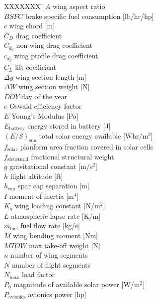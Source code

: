 \documentclass[]{aiaa-tc}%
\begin{document}
\begin{multicols}{2}
\small

\begin{tabbing}
  XXXXXXX \= \kill%
$A$ \> wing aspect ratio \\
$BSFC$ \> brake specific fuel consumption [lb/hr/hp] \\
$c$ \> wing chord [m] \\
$C_D$ \> drag coefficient \\
$C_{d_0}$ \> non-wing drag coefficient \\
$c_{d_p}$ \> wing profile drag coefficient \\
$C_L$ \> lift coefficient \\
$\Delta y$ \> wing section length [m] \\
$\Delta W$ \> wing section weight [N] \\
$DOY$ \> day of the year \\
$e$ \> Oswald efficiency factor \\
$E$ \> Young's Modulus [Pa] \\
$E_{\text{battery}}$ \> energy stored in battery [J] \\
$(E/S)_{\text{sun}}$ \> total solar energy available [Whr/m$^2$] \\
$f_{\text{solar}}$ \> planform area fraction covered in solar cells \\
$f_{\text{structural}}$ \> fractional structural weight\\
$g$ \> gravitational constant [m/s$^2$] \\
$h$ \> flight altitude [ft] \\
$h_{\text{cap}}$ \> spar cap separation [m] \\
$I$ \> moment of inertia [m$^4$] \\
$K_q$ \> wing loading constant [N/m$^2$] \\
$L$ \> atmospheric lapse rate [K/m] \\
$\dot{m}_{\text{fuel}}$ \> fuel flow rate [kg/s] \\
$M$ \> wing bending moment [Nm] \\
$MTOW$ \> max take-off weight [N] \\
$n$ \> number of wing segments \\
$N$ \> number of flight segments \\
$N_{max}$ \> load factor\\
$P_{0}$ \> magnitude of available solar power [W/m$^2$] \\
$P_{\text{avionics}}$ \> avionics power [hp] \\

\end{tabbing}
\end{multicols}
\end{document}
